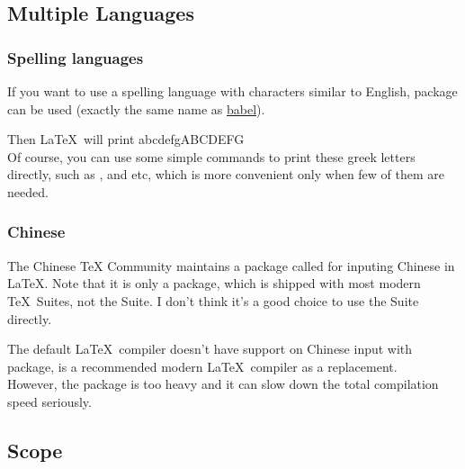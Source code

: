\subsection{Multiple Languages}

\begin{frame}[fragile]
	\frametitle{Spelling languages}
	If you want to use a spelling language with characters similar to English, package  can be used (exactly the same name as \href{http://babeljs.io/}{babel}).
	Then \LaTeX\ will print \textgreek{abcdefgABCDEFG} \\
	Of course, you can use some simple commands to print these greek letters directly, such as \LC{\alpha}, \LC{\beta} and etc, which is more convenient only when few of them are needed.
\end{frame}

\begin{frame}[fragile]
	\frametitle{Chinese}
	The Chinese TeX Community maintains a package called  for inputing Chinese in \LaTeX. Note that it is only a package, which is shipped with most modern \TeX\ Suites, not the  Suite. I don't think it's a good choice to use the  Suite directly.
	\begin{command}
		\texttt{\usepackage{ctex}}
	\end{command}
	The default \LaTeX\ compiler  doesn't have support on Chinese input with  package,  is a recommended modern \LaTeX\ compiler as a replacement. \\

	However, the  package is too heavy and it can slow down the total compilation speed seriously. 
\end{frame}

\subsection{Scope}

